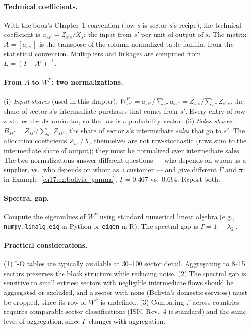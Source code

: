\documentclass[../structural_economics_book.tex]{subfiles}
\begin{document}
\paragraph{Technical coefficients.} With the book's Chapter~1 convention (row $s$ is sector $s$'s recipe), the technical coefficient is $a_{ss'} = Z_{s's}/X_s$: the input from $s'$ per unit of output of $s$. The matrix $A = [a_{ss'}]$ is the transpose of the column-normalized table familiar from the statistical convention. Multipliers and linkages are computed from $L = (I - A')^{-1}$.

\paragraph{From $A$ to $W^P$: two normalizations.} (i) \emph{Input shares} (used in this chapter): $W^P_{ss'} = a_{ss'}/\sum_{s''}a_{ss''} = Z_{s's}/\sum_{s''}Z_{s''s}$, the share of sector $s$'s intermediate purchases that comes from $s'$. Every entry of row $s$ shares the denominator, so the row is a probability vector. (ii) \emph{Sales shares}: $B_{ss'} = Z_{ss'}/\sum_{s''}Z_{ss''}$, the share of sector $s$'s intermediate \emph{sales} that go to $s'$. The allocation coefficients $Z_{ss'}/X_s$ themselves are not row-stochastic (rows sum to the intermediate share of output); they must be normalized over intermediate sales. The two normalizations answer different questions --- who depends on whom as a supplier, vs.\ who depends on whom as a customer --- and give different $\Gamma$ and $\boldsymbol{\pi}$: in Example~\ref{ch17:ex:bolivia_gamma}, $\Gamma = 0.467$ vs.\ $0.694$. Report both.

\paragraph{Spectral gap.} Compute the eigenvalues of $W^P$ using standard numerical linear algebra (e.g., \texttt{numpy.linalg.eig} in Python or \texttt{eigen} in R). The spectral gap is $\Gamma = 1 - |\lambda_2|$.

\paragraph{Practical considerations.} (1) I-O tables are typically available at 30--100 sector detail. Aggregating to 8--15 sectors preserves the block structure while reducing noise. (2) The spectral gap is sensitive to small entries: sectors with negligible intermediate flows should be aggregated or excluded, and a sector with none (Bolivia's domestic services) must be dropped, since its row of $W^P$ is undefined. (3) Comparing $\Gamma$ across countries requires comparable sector classifications (ISIC Rev.~4 is standard) and the same level of aggregation, since $\Gamma$ changes with aggregation.
\end{document}
